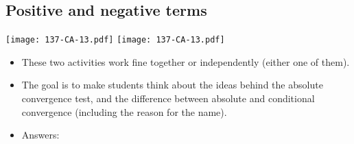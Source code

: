\documentclass[11pt]{article}
\newcommand{\nl}{\hfill \vspace{-1.1\baselineskip}} %
\begin{document}
\newpage
\subsection{Positive and negative terms}

\begin{center}
{ \texttt{[image: 137-CA-13.pdf]}} \quad
{ \texttt{[image: 137-CA-13.pdf]}} 
\end{center}

\begin{comments}
\nl
	\begin{itemize}
		\item These two activities work fine together or independently (either one of them).
		\item   The goal is to make students think about the ideas behind the absolute convergence test, and the difference between absolute and conditional convergence (including the reason for the name).  
		\item Answers:
	\end{itemize}
\end{comments}
\end{document}
